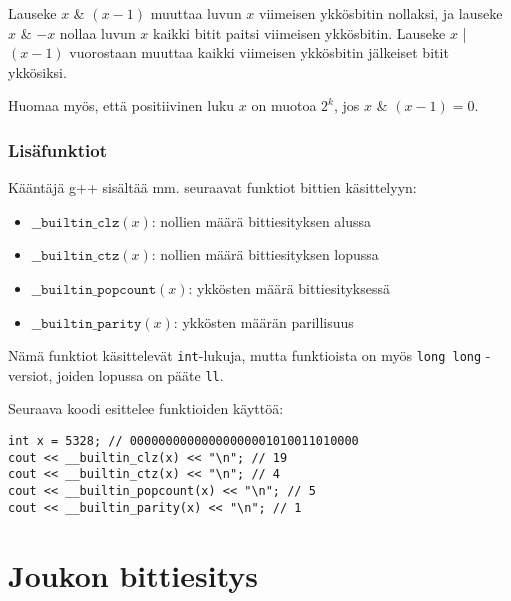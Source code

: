 Lauseke $x$ \& $(x-1)$ muuttaa luvun $x$ viimeisen
ykkösbitin nollaksi, ja lauseke $x$ \& $-x$ nollaa
luvun $x$ kaikki bitit paitsi viimeisen ykkösbitin.
Lauseke $x$ | $(x-1)$ vuorostaan muuttaa kaikki
viimeisen ykkösbitin jälkeiset bitit ykkösiksi.

Huomaa myös, että positiivinen luku $x$ on muotoa $2^k$,
jos $x$ \& $(x-1) = 0$.
% 
% 

\subsubsection*{Lisäfunktiot}

Kääntäjä g++ sisältää mm. seuraavat funktiot
bittien käsittelyyn:

\begin{itemize}
\item
$\texttt{\_\_builtin\_clz}(x)$:
nollien määrä bittiesityksen alussa
\item
$\texttt{\_\_builtin\_ctz}(x)$:
nollien määrä bittiesityksen lopussa
\item
$\texttt{\_\_builtin\_popcount}(x)$:
ykkösten määrä bittiesityksessä
\item
$\texttt{\_\_builtin\_parity}(x)$:
ykkösten määrän parillisuus
\end{itemize}
\begin{samepage}
Nämä funktiot käsittelevät \texttt{int}-lukuja,
mutta funktioista on myös \texttt{long long} -versiot,
joiden lopussa on pääte \texttt{ll}.

Seuraava koodi esittelee funktioiden käyttöä:

\begin{lstlisting}
int x = 5328; // 00000000000000000001010011010000
cout << __builtin_clz(x) << "\n"; // 19
cout << __builtin_ctz(x) << "\n"; // 4
cout << __builtin_popcount(x) << "\n"; // 5
cout << __builtin_parity(x) << "\n"; // 1
\end{lstlisting}
\end{samepage}

\section{Joukon bittiesitys}

